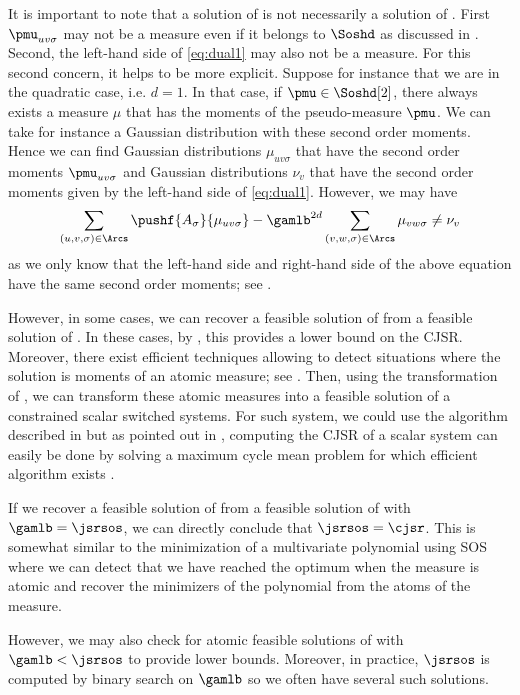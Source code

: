 \documentclass[11pt,twoside,a4paper,openright]{uclouvain-thesis}
\begin{document}
It is important to note that a solution of  is not necessarily a solution of .
First $\pmu_{uv\sigma}$ may not be a measure even if it belongs to $\Soshd$ as discussed in .
Second, the left-hand side of \eqref{eq:dual1} may also not be a measure.
For this second concern, it helps to be more explicit.
Suppose for instance that we are in the quadratic case, i.e. $d = 1$.
In that case, if $\pmu \in \Soshd[2]$, there always exists a measure $\mu$ that has the moments of the pseudo-measure $\pmu$.
We can take for instance a Gaussian distribution with these second order moments.
Hence we can find Gaussian distributions $\mu_{uv\sigma}$ that have the second order moments $\pmu_{uv\sigma}$
and Gaussian distributions $\nu_v$ that have the second order moments given by the left-hand side of \eqref{eq:dual1}.
However, we may have
\[ \sum_{(u,v,\sigma) \in \Arcs} \pushf{A_\sigma}{\mu_{uv\sigma}} - \gamlb^{2d} \sum_{(v,w,\sigma) \in \Arcs} \mu_{vw\sigma} \neq \nu_v \]
as we only know that the left-hand side and right-hand side of the above equation have the same second order moments;
see .

However, in some cases, we can recover a feasible solution of  from a feasible solution of .
In these cases, by , this provides a lower bound on the CJSR.
Moreover, there exist efficient techniques allowing to detect situations where the solution is moments of an atomic measure; see \cite{henrion2005detecting, laurent2009sums}.
Then, using the transformation of , we can transform
these atomic measures into a feasible solution of a constrained scalar switched systems.
For such system, we could use the algorithm described in  but as pointed out in \cite{ahmadi2012joint},
computing the CJSR of a scalar system can easily be done by solving a maximum cycle mean problem for which efficient algorithm exists \cite{karp1978characterization}.

If we recover a feasible solution of  from a feasible solution of  with $\gamlb = \jsrsos$,
we can directly conclude that $\jsrsos = \cjsr$.
This is somewhat similar to the minimization of a multivariate polynomial using SOS where we can detect that we have reached the optimum
when the measure is atomic and recover the minimizers of the polynomial from the atoms of the measure. %

However, we may also check for atomic feasible solutions of  with $\gamlb < \jsrsos$ to provide lower bounds.
Moreover, in practice, $\jsrsos$ is computed by binary search on $\gamlb$ so we often have several such solutions.
\end{document}
